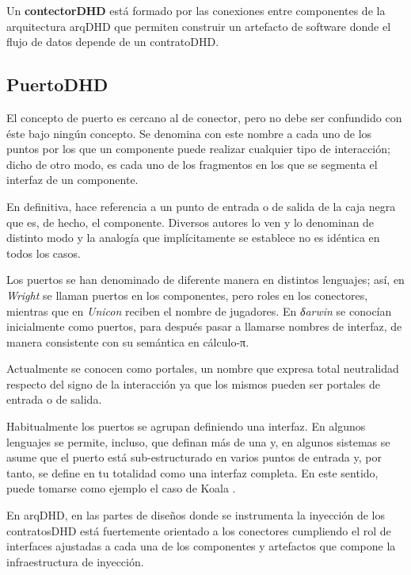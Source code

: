 \begin{defi}
Un \textbf{contectorDHD} está formado por las conexiones entre componentes de la arquitectura arqDHD que permiten construir un artefacto de software donde el flujo de datos depende de un contratoDHD.
\end{defi}


\subsection{PuertoDHD} 

El concepto de puerto es cercano al de conector, pero no debe ser confundido con
éste bajo ningún concepto. Se denomina con este nombre a cada uno de los
puntos por los que un componente puede realizar cualquier tipo de interacción;
dicho de otro modo, es cada uno de los fragmentos en los que se segmenta el
interfaz de un componente.

En definitiva, hace referencia a un punto de entrada o de salida de la caja
negra que es, de hecho, el componente. Diversos autores lo ven y lo denominan de
distinto modo y la analogía que implícitamente se establece no es idéntica
en todos los casos. 

Los puertos se han denominado de diferente manera en distintos lenguajes; así,
en \emph{Wright} se llaman puertos en los componentes, pero roles en los
conectores,
mientras que en \emph{Unicon} reciben el nombre de jugadores. En \emph{δarwin} se
conocían inicialmente como puertos, para después pasar a llamarse nombres de
interfaz, de manera consistente con su semántica en cálculo-π.

Actualmente se conocen como portales, un nombre que expresa total neutralidad
respecto del signo de la interacción ya que los mismos pueden ser portales de entrada o de
salida.

Habitualmente los puertos se agrupan definiendo una interfaz. En algunos
lenguajes se permite, incluso, que definan más de una y, en algunos
sistemas se asume que el puerto está sub-estructurado en varios puntos de
entrada y, por tanto, se define en tu totalidad como una interfaz completa. En este sentido, puede tomarse como ejemplo el caso de Koala \cite{vOvdLKM00}.

En arqDHD, en las partes de diseños donde se instrumenta la inyección de los contratosDHD está fuertemente orientado a los conectores cumpliendo el rol de interfaces ajustadas a cada una de los componentes y artefactos que compone la infraestructura de inyección. 


